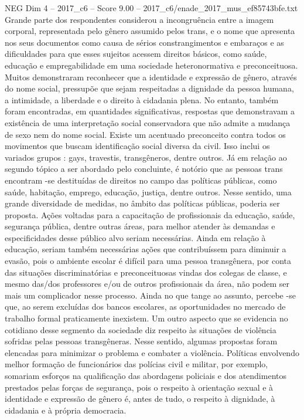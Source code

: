 \begin{textsample}{NEG Dim 4 – 2017\_c6 – Score 9.00 – 2017\_c6/enade\_2017\_mus\_ef85743bfe.txt}
Grande parte dos respondentes considerou a incongruência entre a imagem corporal, representada pelo gênero assumido pelos trans, e o nome que apresenta nos seus documentos como causa de sérios constrangimentos e embaraços e as dificuldades para que esses sujeitos acessem direitos básicos, como saúde, educação e empregabilidade em uma sociedade heteronormativa e preconceituosa.
Muitos demonstraram reconhecer que a identidade e expressão de gênero, através do nome social, pressupõe que sejam respeitadas a dignidade da pessoa humana, a intimidade, a liberdade e o direito à cidadania plena.
No entanto, também foram encontradas, em quantidades significativas, respostas que demonstravam a existência de uma interpretação social conservadora que não admite a mudança de sexo nem do nome social.
Existe um acentuado preconceito contra todos os movimentos que buscam identificação social diversa da civil.
Isso inclui os variados grupos : gays, travestis, transgêneros, dentre outros.
Já em relação ao segundo tópico a ser abordado pelo concluinte, é notório que as pessoas trans encontram -se destituídas de direitos no campo das políticas públicas, como saúde, habitação, emprego, educação, justiça, dentre outros.
Nesse sentido, uma grande diversidade de medidas, no âmbito das políticas públicas, poderia ser proposta.
Ações voltadas para a capacitação de profissionais da educação, saúde, segurança pública, dentre outras áreas, para melhor atender às demandas e especificidades desse público alvo seriam necessárias.
Ainda em relação à educação, seriam também necessárias ações que contribuíssem para diminuir a evasão, pois o ambiente escolar é difícil para uma pessoa transgênera, por conta das situações discriminatórias e preconceituosas vindas dos colegas de classe, e mesmo das/dos professores e/ou de outros profissionais da área, não podem ser mais um complicador nesse processo.
Ainda no que tange ao assunto, percebe -se que, ao serem excluídas dos bancos escolares, as oportunidades no mercado de trabalho formal praticamente inexistem.
Um outro aspecto que se evidencia no cotidiano desse segmento da sociedade diz respeito às situações de violência sofridas pelas pessoas transgêneras.
Nesse sentido, algumas propostas foram elencadas para minimizar o problema e combater a violência.
Políticas envolvendo melhor formação de funcionários das polícias civil e militar, por exemplo, somariam esforços na qualificação das abordagens policiais e dos atendimentos prestados pelas forças de segurança, pois o respeito à orientação sexual e à identidade e expressão de gênero é, antes de tudo, o respeito à dignidade, à cidadania e à própria democracia.

\end{textsample}
